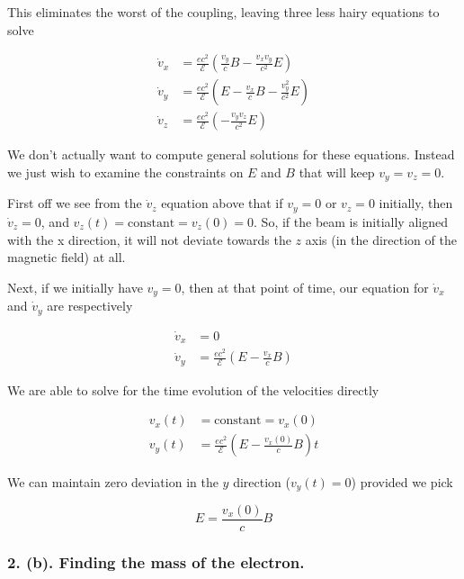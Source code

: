 This eliminates the worst of the coupling, leaving three less hairy equations to solve

\begin{align}\label{eqn:relElectroDynProblemSet2:350}
\dot{v}_x &= \frac{e c^2}{\mathcal{E}} \left( \frac{v_y}{c} B - \frac{v_x v_y}{c^2} E \right) \\
\dot{v}_y &= \frac{e c^2}{\mathcal{E}} \left( E - \frac{v_x}{c} B - \frac{v_y^2}{c^2} E \right) \\
\dot{v}_z &= \frac{e c^2}{\mathcal{E}} \left( - \frac{v_y v_z}{c^2} E \right)
\end{align}

We don't actually want to compute general solutions for these equations.  Instead we just wish to examine the constraints on $E$ and $B$ that will keep $v_y = v_z = 0$.

First off we see from the $\dot{v}_z$ equation above that if $v_y = 0$ or $v_z = 0$ initially, then $\dot{v}_z = 0$, and $v_z(t) = \text{constant} = v_z(0) = 0$.  So, if the beam is initially aligned with the x direction, it will not deviate towards the $z$ axis (in the direction of the magnetic field) at all.

Next, if we initially have $v_y = 0$, then at that point of time, our equation for $\dot{v}_x$ and $\dot{v}_y$ are respectively

\begin{align}\label{eqn:relElectroDynProblemSet2:370}
\dot{v}_x &= 0 \\
\dot{v}_y &= \frac{e c^2}{\mathcal{E}} \left( E - \frac{v_x}{c} B \right) 
\end{align}

We are able to solve for the time evolution of the velocities directly

\begin{align}\label{eqn:relElectroDynProblemSet2:390}
v_x(t) &= \text{constant} = v_x(0) \\
v_y(t) &= \frac{e c^2}{\mathcal{E}} \left( E - \frac{v_x(0)}{c} B \right) t
\end{align}

We can maintain zero deviation in the $y$ direction ($v_y(t) = 0$) provided we pick

\begin{equation}\label{eqn:relElectroDynProblemSet2:410}
E = \frac{v_x(0)}{c} B
\end{equation}

\subsubsection{2. (b). Finding the mass of the electron.}

